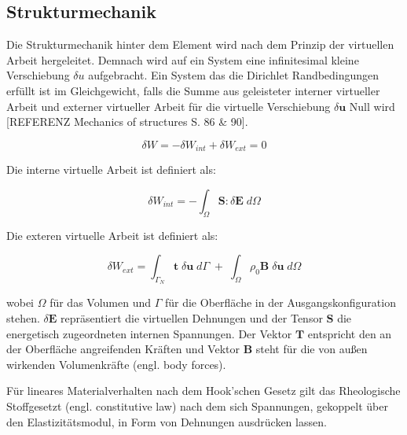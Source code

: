 \documentclass[german,a4paper,12pt,oneside]{scrbook}
\theoremstyle{definition}
\theoremstyle{definition}
\theoremstyle{definition}
\theoremstyle{definition}
\theoremstyle{definition}
\theoremstyle{definition}
\begin{document}
\subsection{Strukturmechanik}
Die Strukturmechanik hinter dem Element wird nach dem Prinzip der virtuellen Arbeit hergeleitet. Demnach wird auf ein System eine infinitesimal kleine Verschiebung $\delta u$ aufgebracht. Ein System das die Dirichlet Randbedingungen erfüllt ist im Gleichgewicht, falls die Summe aus geleisteter  interner virtueller Arbeit und  externer virtueller Arbeit für die virtuelle Verschiebung $\delta \bm{u}$ Null wird [REFERENZ Mechanics of structures S. 86 \& 90]. 

\begin{equation} \label{virtuelle Arbeit}    
    \delta W = - \delta W_{int} + \delta W_{ext} = 0    
\end{equation}      

\vspace{0.5cm}
Die interne virtuelle Arbeit ist definiert als:

\begin{equation} \label{ interne Arbeit}
    \delta W_{int} = - \int_{\Omega}^{} \bm{S} : \delta \bm{E} \; d \Omega
\end{equation}

\vspace{0.5cm}
Die exteren virtuelle Arbeit ist definiert als:

\begin{equation} \label{externe Arbeit}
    \delta W_{ext} = \int_ {\Gamma_N}{} \bm{t} \; \delta \bm{u} \; d \Gamma \; 
    + \; \int_{\Omega}{} \rho_0 \bm{B} \; \delta \bm{u} \; d \Omega
\end{equation}


\vspace{0.5cm}
wobei $\Omega$ für das Volumen und $\Gamma$ für die Oberfläche in der Ausgangskonfiguration stehen. $\delta \bm{E}$ repräsentiert die virtuellen Dehnungen und der Tensor $\bm{S}$ die energetisch zugeordneten internen Spannungen. Der Vektor $\bm{T}$ entspricht den an der Oberfläche angreifenden Kräften und Vektor $\bm{B}$ steht für die von außen wirkenden Volumenkräfte (engl. body forces). 

\vspace{0.5cm}
Für lineares Materialverhalten nach dem Hook'schen Gesetz gilt das Rheologische Stoffgesetzt (engl. constitutive law) nach dem sich Spannungen, gekoppelt über den Elastizitätsmodul, in Form von Dehnungen ausdrücken lassen. 
\end{document}
